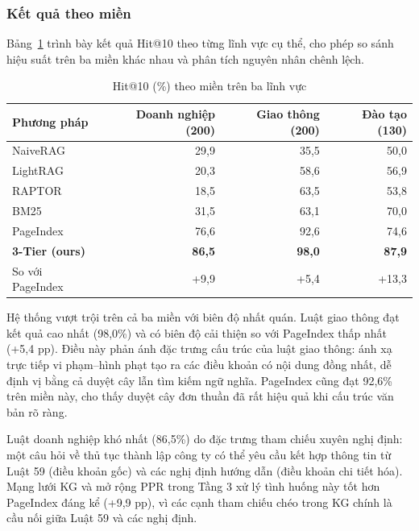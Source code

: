 \subsubsection*{Kết quả theo miền}

Bảng~\ref{tab:hit10-mien} trình bày kết quả Hit@10 theo từng lĩnh vực cụ thể, cho phép so
sánh hiệu suất trên ba miền khác nhau và phân tích nguyên nhân chênh lệch.

\begin{table}[htbp]
  \centering
  \caption{Hit@10 (\%) theo miền trên ba lĩnh vực}
  \label{tab:hit10-mien}
  \small
  \begin{tabular}{lrrr}
    \toprule
    \textbf{Phương pháp} & \textbf{Doanh nghiệp (200)} & \textbf{Giao thông (200)} & \textbf{Đào tạo (130)} \\
    \midrule
    NaiveRAG  & 29{,}9 & 35{,}5 & 50{,}0 \\
    LightRAG  & 20{,}3 & 58{,}6 & 56{,}9 \\
    RAPTOR    & 18{,}5 & 63{,}5 & 53{,}8 \\
    BM25      & 31{,}5 & 63{,}1 & 70{,}0 \\
    PageIndex & 76{,}6 & 92{,}6 & 74{,}6 \\
    \textbf{3-Tier (ours)} & \textbf{86{,}5} & \textbf{98{,}0} & \textbf{87{,}9} \\
    So với PageIndex & +9{,}9 & +5{,}4 & +13{,}3 \\
    \bottomrule
  \end{tabular}
\end{table}

Hệ thống vượt trội trên cả ba miền với biên độ nhất quán. Luật giao thông đạt kết quả
cao nhất (98,0\%) và có biên độ cải thiện so với PageIndex thấp nhất (+5,4 pp). Điều này
phản ánh đặc trưng cấu trúc của luật giao thông: ánh xạ trực tiếp vi phạm--hình phạt tạo
ra các điều khoản có nội dung đồng nhất, dễ định vị bằng cả duyệt cây lẫn tìm kiếm
ngữ nghĩa. PageIndex cũng đạt 92,6\% trên miền này, cho thấy duyệt cây đơn thuần đã
rất hiệu quả khi cấu trúc văn bản rõ ràng.

Luật doanh nghiệp khó nhất (86,5\%) do đặc trưng tham chiếu xuyên nghị định: một
câu hỏi về thủ tục thành lập công ty có thể yêu cầu kết hợp thông tin từ Luật 59
(điều khoản gốc) và các nghị định hướng dẫn (điều khoản chi tiết hóa). Mạng lưới KG
và mở rộng PPR trong Tầng 3 xử lý tình huống này tốt hơn PageIndex đáng kể (+9,9
pp), vì các cạnh tham chiếu chéo trong KG chính là cầu nối giữa Luật 59 và các nghị
định.

